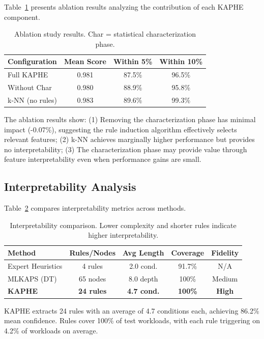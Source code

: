 \documentclass[11pt,a4paper]{article}
\begin{document}
Table~\ref{tab:ablation} presents ablation results analyzing the contribution of each KAPHE component.

\begin{table}[t]
\caption{Ablation study results. Char = statistical characterization phase.}
\label{tab:ablation}
\centering
\begin{tabular}{lccc}
\toprule
Configuration & Mean Score & Within 5\% & Within 10\% \\
\midrule
Full KAPHE & 0.981 & 87.5\% & 96.5\% \\
Without Char & 0.980 & 88.9\% & 95.8\% \\
k-NN (no rules) & 0.983 & 89.6\% & 99.3\% \\
\bottomrule
\end{tabular}
\end{table}

The ablation results show: (1) Removing the characterization phase has minimal impact (-0.07\%), suggesting the rule induction algorithm effectively selects relevant features; (2) k-NN achieves marginally higher performance but provides no interpretability; (3) The characterization phase may provide value through feature interpretability even when performance gains are small.

\subsection{Interpretability Analysis}

Table~\ref{tab:interpretability} compares interpretability metrics across methods.

\begin{table}[t]
\caption{Interpretability comparison. Lower complexity and shorter rules indicate higher interpretability.}
\label{tab:interpretability}
\centering
\begin{tabular}{lcccc}
\toprule
Method & Rules/Nodes & Avg Length & Coverage & Fidelity \\
\midrule
Expert Heuristics & 4 rules & 2.0 cond. & 91.7\% & N/A \\
MLKAPS (DT) & 65 nodes & 8.0 depth & 100\% & Medium \\
\textbf{KAPHE} & \textbf{24 rules} & \textbf{4.7 cond.} & \textbf{100\%} & \textbf{High} \\
\bottomrule
\end{tabular}
\end{table}

KAPHE extracts 24 rules with an average of 4.7 conditions each, achieving 86.2\% mean confidence. Rules cover 100\% of test workloads, with each rule triggering on 4.2\% of workloads on average.
\end{document}
